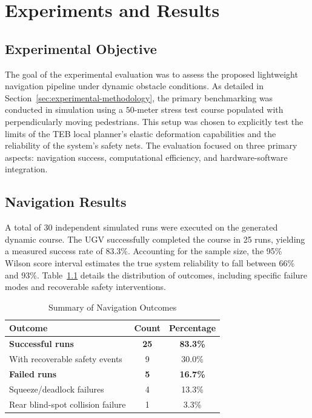 
\chapter{Experiments and Results}
\label{chap:experiments}

\section{Experimental Objective}
\label{sec:experimental-objective}

The goal of the experimental evaluation was to assess the proposed lightweight navigation pipeline under dynamic obstacle conditions. As detailed in Section~\ref{sec:experimental-methodology}, the primary benchmarking was conducted in simulation using a $50$-meter stress test course populated with perpendicularly moving pedestrians. This setup was chosen to explicitly test the limits of the TEB local planner's elastic deformation capabilities and the reliability of the system's safety nets. The evaluation focused on three primary aspects: navigation success, computational efficiency, and hardware-software integration.

\section{Navigation Results}
\label{sec:navigation-results}

A total of 30 independent simulated runs were executed on the generated dynamic course. The UGV successfully completed the course in 25 runs, yielding a measured success rate of 83.3\%. Accounting for the sample size, the 95\% Wilson score interval estimates the true system reliability to fall between 66\% and 93\%. Table~\ref{tab:navigation-outcomes} details the distribution of outcomes, including specific failure modes and recoverable safety interventions.

\begin{table}[htpb]
    \centering
    \caption{Summary of Navigation Outcomes}
    \label{tab:navigation-outcomes}
    \begin{tabular}{lcc}
        \hline
        \textbf{Outcome} & \textbf{Count} & \textbf{Percentage} \\
        \hline
        \textbf{Successful runs} & \textbf{25} & \textbf{83.3\%} \\
        \quad With recoverable safety events & 9 & 30.0\% \\
        \textbf{Failed runs} & \textbf{5} & \textbf{16.7\%} \\
        \quad Squeeze/deadlock failures & 4 & 13.3\% \\
        \quad Rear blind-spot collision failure & 1 & 3.3\% \\
        \hline
    \end{tabular}
\end{table}

